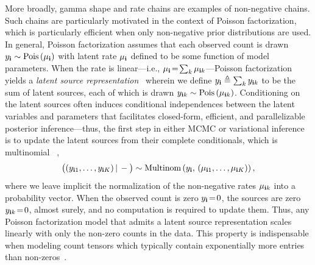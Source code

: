 \documentclass{article}
\begin{document}
More broadly, gamma shape and rate chains are examples of non-negative chains. Such chains are particularly motivated in the context of Poisson factorization, which is particularly efficient when only non-negative prior distributions are used. In general, Poisson factorization assumes that each observed count is drawn $y_{\textbf{\textrm{i}}} \sim \textrm{Pois}\left( \mu_{\textbf{\textrm{i}}} \right)$ with latent rate $\mu_{\textbf{\textrm{i}}}$ defined to be some function of model parameters. When the rate is linear---i.e., $\mu_{\textbf{\textrm{i}}} \!=\! \sum_{k}\mu_{\textbf{\textrm{i}} k}$---Poisson factorization yields a \emph{latent source representation}~\cite{Dunson2005bayesianlatent,cemgil2009bayesian} wherein we define $y_{\textbf{\textrm{i}}} \triangleq \sum_k y_{\textbf{\textrm{i}} k}$ to be the sum of latent sources, each of which is drawn $y_{\textbf{\textrm{i}} k} \sim \textrm{Pois}\left( \mu_{\textbf{\textrm{i}} k} \right)$. Conditioning on the latent sources often induces conditional independences between the latent variables and parameters that facilitates closed-form, efficient, and parallelizable posterior inference---thus, the first step in either MCMC or variational inference is to update the latent sources from their complete conditionals, which is multinomial \cite{steel1953relation}~,
\begin{equation}
\label{eq:thinning}
\big((y_{\textbf{\textrm{i}}1},\dots,y_{\textbf{\textrm{i}} K})\,|\,-\big) \sim \textrm{Multinom}\left( y_{\textbf{\textrm{i}}},\, (\mu_{\textbf{\textrm{i}} 1},\dots, \mu_{\textbf{\textrm{i}} K}) \right),
\end{equation}
where we leave implicit the normalization of the non-negative rates $\mu_{\textbf{\textrm{i}} k}$ into a probability vector. When the observed count is zero $y_{\textbf{\textrm{i}}} \!=\! 0$, the sources are zero $y_{\textbf{\textrm{i}} k} \!=\! 0$, almost surely, and no computation is required to update them. Thus, any Poisson factorization model that admits a latent source representation scales linearly with only the non-zero counts in the data. This property is indispensable when modeling count tensors which typically contain exponentially more entries than non-zeros~\cite{bhattacharya2012simplex}. 
\end{document}
